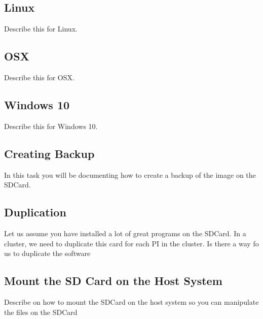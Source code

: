 \subsection{Linux}

\begin{exercise}
Describe this for Linux.
\end{exercise}

\subsection{OSX}

\begin{exercise}
Describe this for OSX.
\end{exercise}


\subsection{Windows 10}

\begin{exercise}
Describe this for Windows 10.
\end{exercise}


\subsection{Creating Backup}

\begin{exercise}
In this task you will be documenting how to create a backup of the
image on the SDCard.
\end{exercise}

\subsection{Duplication}

\begin{exercise}
Let us assume you have installed a lot of great programs on the
SDCard. In a cluster, we need to duplicate this card for each PI in
the cluster. Is there a way fo us to duplicate the software
\end{exercise}

\subsection{Mount the SD Card on the Host System}

\begin{exercise}
Describe on how to mount the SDCard on the host system so you can
manipulate the files on the SDCard
\end{exercise}

